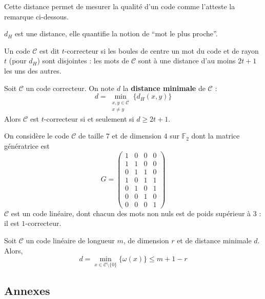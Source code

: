 	Cette distance permet de mesurer la qualité d'un code comme l'atteste la remarque ci-dessous.
	
	\begin{remark}
		$d_H$ est une distance, elle quantifie la notion de ``mot le plus proche''.
	\end{remark}
	
	\begin{definition}
		Un code $\mathcal{C}$ est dit $t$-correcteur si les boules de centre un mot du code et de rayon $t$ (pour $d_H$) sont disjointes : les mots de $\mathcal{C}$ sont à une distance d'au moins $2t+1$ les uns des autres.
	\end{definition}
	
	\begin{proposition}
		Soit $\mathcal{C}$ un code correcteur. On note $d$ la \textbf{distance minimale} de $\mathcal{C}$ :
		\[ d = \min_{\substack{x, y \in \mathcal{C} \\ x \neq y}} \{ d_H(x,y) \} \]
		Alors $\mathcal{C}$ est $t$-correcteur si et seulement si $d \geq 2t+1$.
	\end{proposition}
	
	\begin{example}
		On considère le code $\mathcal{C}$ de taille $7$ et de dimension $4$ sur $\mathbb{F}_2$ dont la matrice génératrice est
		\[
			G =
			\begin{pmatrix}
				1 & 0 & 0 & 0 \\
				1 & 1 & 0 & 0 \\
				0 & 1 & 1 & 0 \\
				1 & 0 & 1 & 1 \\
				0 & 1 & 0 & 1 \\
				0 & 0 & 1 & 0 \\
				0 & 0 & 0 & 1
			\end{pmatrix}
		\]
		$\mathcal{C}$ est un code linéaire, dont chacun des mots non nuls est de poids supérieur à $3$ : il est $1$-correcteur.
	\end{example}
	
	\begin{proposition}
		Soit $\mathcal{C}$ un code linéaire de longueur $m$, de dimension $r$ et de distance minimale $d$. Alors,
		\[ d = \min_{x \in \mathcal{C} \setminus \{ 0 \}} \{ \omega(x) \} \leq m+1-r \]
	\end{proposition}

	\newpage
	\subsection*{Annexes}
	
